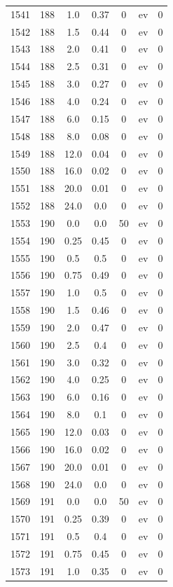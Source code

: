 \documentclass[12pt,a4paper]{article}
\begin{document}
\begin{tabular}{r|cccccc}
	1541 & 188 & 1.0 & 0.37 & 0 & ev & 0 \\
	1542 & 188 & 1.5 & 0.44 & 0 & ev & 0 \\
	1543 & 188 & 2.0 & 0.41 & 0 & ev & 0 \\
	1544 & 188 & 2.5 & 0.31 & 0 & ev & 0 \\
	1545 & 188 & 3.0 & 0.27 & 0 & ev & 0 \\
	1546 & 188 & 4.0 & 0.24 & 0 & ev & 0 \\
	1547 & 188 & 6.0 & 0.15 & 0 & ev & 0 \\
	1548 & 188 & 8.0 & 0.08 & 0 & ev & 0 \\
	1549 & 188 & 12.0 & 0.04 & 0 & ev & 0 \\
	1550 & 188 & 16.0 & 0.02 & 0 & ev & 0 \\
	1551 & 188 & 20.0 & 0.01 & 0 & ev & 0 \\
	1552 & 188 & 24.0 & 0.0 & 0 & ev & 0 \\
	1553 & 190 & 0.0 & 0.0 & 50 & ev & 0 \\
	1554 & 190 & 0.25 & 0.45 & 0 & ev & 0 \\
	1555 & 190 & 0.5 & 0.5 & 0 & ev & 0 \\
	1556 & 190 & 0.75 & 0.49 & 0 & ev & 0 \\
	1557 & 190 & 1.0 & 0.5 & 0 & ev & 0 \\
	1558 & 190 & 1.5 & 0.46 & 0 & ev & 0 \\
	1559 & 190 & 2.0 & 0.47 & 0 & ev & 0 \\
	1560 & 190 & 2.5 & 0.4 & 0 & ev & 0 \\
	1561 & 190 & 3.0 & 0.32 & 0 & ev & 0 \\
	1562 & 190 & 4.0 & 0.25 & 0 & ev & 0 \\
	1563 & 190 & 6.0 & 0.16 & 0 & ev & 0 \\
	1564 & 190 & 8.0 & 0.1 & 0 & ev & 0 \\
	1565 & 190 & 12.0 & 0.03 & 0 & ev & 0 \\
	1566 & 190 & 16.0 & 0.02 & 0 & ev & 0 \\
	1567 & 190 & 20.0 & 0.01 & 0 & ev & 0 \\
	1568 & 190 & 24.0 & 0.0 & 0 & ev & 0 \\
	1569 & 191 & 0.0 & 0.0 & 50 & ev & 0 \\
	1570 & 191 & 0.25 & 0.39 & 0 & ev & 0 \\
	1571 & 191 & 0.5 & 0.4 & 0 & ev & 0 \\
	1572 & 191 & 0.75 & 0.45 & 0 & ev & 0 \\
	1573 & 191 & 1.0 & 0.35 & 0 & ev & 0 \\

\end{tabular}
\end{document}
